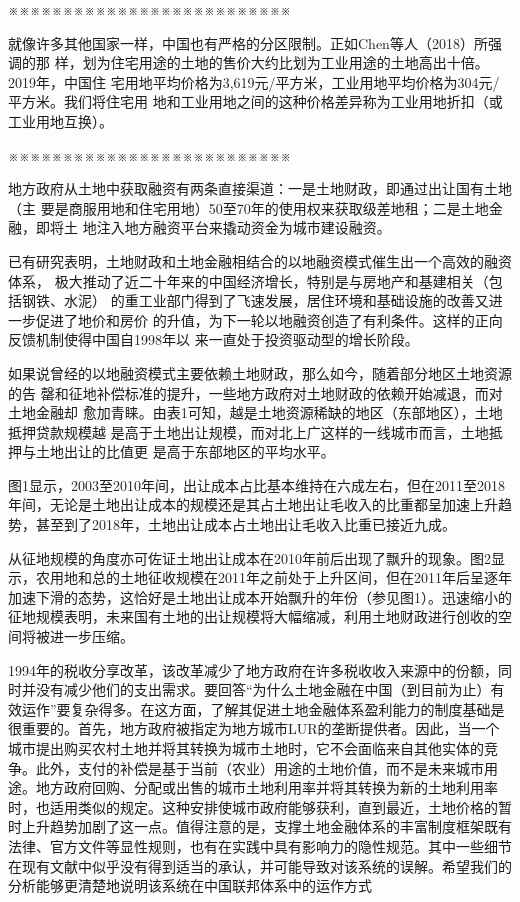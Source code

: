 ※※※※※※※※※※※※※※※※※※※※※※※※※※

就像许多其他国家一样，中国也有严格的分区限制。正如Chen等人（2018）所强调的那
样，划为住宅用途的土地的售价大约比划为工业用途的土地高出十倍。2019年，中国住
宅用地平均价格为3,619元/平方米，工业用地平均价格为304元/平方米。我们将住宅用
地和工业用地之间的这种价格差异称为工业用地折扣（或工业用地互换）。

※※※※※※※※※※※※※※※※※※※※※※※※※※

地方政府从土地中获取融资有两条直接渠道：一是土地财政，即通过出让国有土地（主
要是商服用地和住宅用地）50至70年的使用权来获取级差地租；二是土地金融，即将土
地注入地方融资平台来撬动资金为城市建设融资。

已有研究表明，土地财政和土地金融相结合的以地融资模式催生出一个高效的融资体系，
极大推动了近二十年来的中国经济增长，特别是与房地产和基建相关（包括钢铁、水泥）
的重工业部门得到了飞速发展，居住环境和基础设施的改善又进一步促进了地价和房价
的升值，为下一轮以地融资创造了有利条件。这样的正向反馈机制使得中国自1998年以
来一直处于投资驱动型的增长阶段。

如果说曾经的以地融资模式主要依赖土地财政，那么如今，随着部分地区土地资源的告
罄和征地补偿标准的提升，一些地方政府对土地财政的依赖开始减退，而对土地金融却
愈加青睐。由表1可知，越是土地资源稀缺的地区（东部地区），土地抵押贷款规模越
是高于土地出让规模，而对北上广这样的一线城市而言，土地抵押与土地出让的比值更
是高于东部地区的平均水平。

图1显示，2003至2010年间，出让成本占比基本维持在六成左右，但在2011至2018年间，无论是土地出让成本的规模还是其占土地出让毛收入的比重都呈加速上升趋势，甚至到了2018年，土地出让成本占土地出让毛收入比重已接近九成。

从征地规模的角度亦可佐证土地出让成本在2010年前后出现了飘升的现象。图2显示，农用地和总的土地征收规模在2011年之前处于上升区间，但在2011年后呈逐年加速下滑的态势，这恰好是土地出让成本开始飘升的年份（参见图1）。迅速缩小的征地规模表明，未来国有土地的出让规模将大幅缩减，利用土地财政进行创收的空间将被进一步压缩。

1994年的税收分享改革，该改革减少了地方政府在许多税收收入来源中的份额，同时并没有减少他们的支出需求。要回答“为什么土地金融在中国（到目前为止）有效运作”要复杂得多。在这方面，了解其促进土地金融体系盈利能力的制度基础是很重要的。首先，地方政府被指定为地方城市LUR的垄断提供者。因此，当一个城市提出购买农村土地并将其转换为城市土地时，它不会面临来自其他实体的竞争。此外，支付的补偿是基于当前（农业）用途的土地价值，而不是未来城市用途。地方政府回购、分配或出售的城市土地利用率并将其转换为新的土地利用率时，也适用类似的规定。这种安排使城市政府能够获利，直到最近，土地价格的暂时上升趋势加剧了这一点。值得注意的是，支撑土地金融体系的丰富制度框架既有法律、官方文件等显性规则，也有在实践中具有影响力的隐性规范。其中一些细节在现有文献中似乎没有得到适当的承认，并可能导致对该系统的误解。希望我们的分析能够更清楚地说明该系统在中国联邦体系中的运作方式

